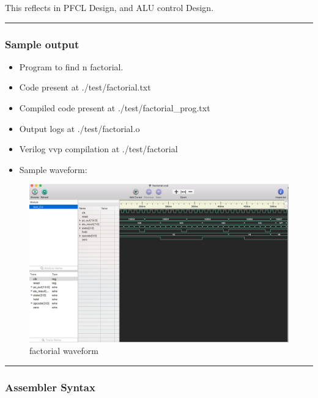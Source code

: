 \documentclass[11pt]{article}
\makeatletter
\def\maxwidth{\ifdim\Gin@nat@width>\linewidth\linewidth
    \else\Gin@nat@width\fi}
\let\Oldincludegraphics\includegraphics
\renewcommand{\includegraphics}[1]{\Oldincludegraphics[width=.8\maxwidth]{#1}}
\providecommand{\tightlist}{%
      \setlength{\itemsep}{0pt}\setlength{\parskip}{0pt}}
\makeatother
\begin{document}
This reflects in PFCL Design, and ALU control Design.

\begin{center}\rule{0.5\linewidth}{\linethickness}\end{center}

\subsubsection{Sample output}\label{sample-output}

\begin{itemize}
\tightlist
\item
  Program to find n factorial.
\item
  Code present at ./test/factorial.txt
\item
  Compiled code present at ./test/factorial\_prog.txt
\item
  Output logs at ./test/factorial.o
\item
  Verilog vvp compilation at ./test/factorial
\item
  Sample waveform:
\end{itemize}

\begin{figure}
\centering
\includegraphics{./Waveforms/factorial.png}
\caption{factorial waveform}
\end{figure}

\begin{center}\rule{0.5\linewidth}{\linethickness}\end{center}

\subsubsection{Assembler Syntax}\label{assembler-syntax}
\end{document}
